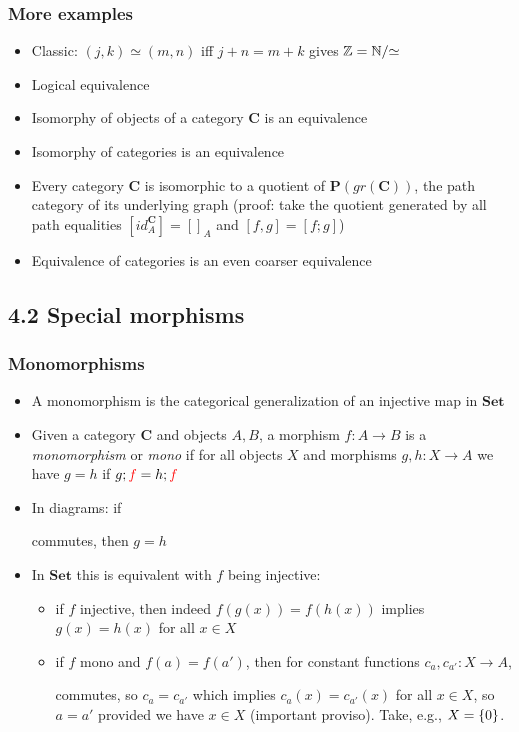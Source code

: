 \documentclass[handout]{beamer}
\newcommand{\bfsf}[1]{{\boldsymbol{#1}}}
\newcommand{\Set}{\bfsf{Set}}
\newcommand{\CC}{\bfsf{C}}
\newcommand{\PP}{\bfsf{P}}
\begin{document}
\frame
  {   
    \frametitle{More examples}\label{Ch4:EqMorExa}

 \begin{itemize}[<+->]
\item Classic: $(j,k)\simeq(m,n)$ iff $j+n = m+k$ gives $\mathbb{Z}=\mathbb{N}/{\simeq}$
\item Logical equivalence
\item Isomorphy of objects of a category $\CC$ is an equivalence
\item Isomorphy of categories is an equivalence
\item Every category $\CC$ is isomorphic to a quotient of $\PP(gr(\CC))$,
the path category of its underlying graph (proof: take the quotient generated
by all path equalities $[id^\CC_A]=[]_A$ and $[f,g] = [f;g]$)
\item Equivalence of categories is an even coarser equivalence
 \end{itemize}

 }

\subsection{4.2 Special morphisms}
 
\frame
  {   
    \frametitle{Monomorphisms}\label{Ch4:Monos}

 \begin{itemize}[<+->]
\item A monomorphism is the categorical generalization of an injective map in $\Set$
\item Given a category $\CC$ and objects $A,B$, a morphism $f: A\to B$ is a
\emph{monomorphism} or \emph{mono} if for all objects $X$ and 
morphisms $g,h: X\to A$ we have $g=h$ if $g;{\color{red}f} = h;{\color{red}f}$
\item In diagrams: if
 commutes, then $g=h$
\item In $\Set$ this is equivalent with $f$ being injective:
 \begin{itemize}
    \item if $f$ injective, then indeed $f(g(x))=f(h(x))$ implies $g(x)=h(x)$ for all $x\in X$
    \item if $f$ mono and $f(a)=f(a')$, then 
for constant functions $c_a,c_{a'} : X\to A$,
commutes, so $c_{a}=c_{a'}$ which implies $c_{a}(x)=c_{a'}(x)$ for all $x\in X$, so $a=a'$
{\color{red}provided we have $x\in X $ (important proviso)}. Take, e.g., $X=\{0\}$.
\end{itemize}
 \end{itemize}

 }
\end{document}
